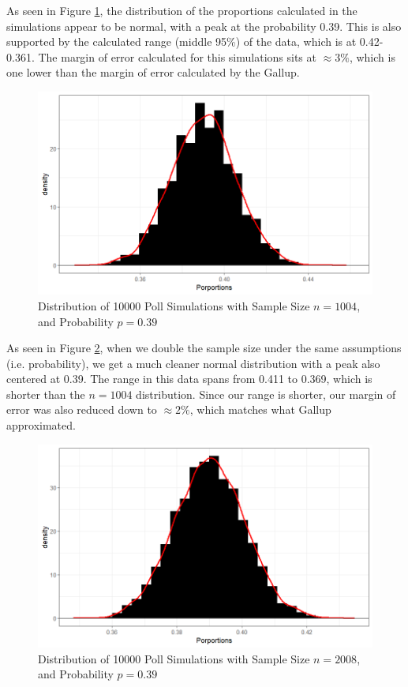 \documentclass{article}\usepackage[]{graphicx}\usepackage[]{xcolor}
\begin{document}
\begin{multicols}{2}
As seen in Figure \hyperref[fig1]{1}, the distribution of the proportions calculated in the simulations appear to be normal, with a peak at the probability 0.39. This is also supported by the calculated range (middle 95\%) of the data, which is at 0.42-0.361. The margin of error calculated for this simulations sits at $\approx 3\%$, which is one lower than the margin of error calculated by the Gallup.

\begin{figure}[H]
  \centering
  \includegraphics[width=\columnwidth]{sample1004.png}
  \caption{Distribution of 10000 Poll Simulations with Sample Size $n = 1004$, and Probability $p = 0.39$}
  \label{fig1}
\end{figure}

As seen in Figure \hyperref[fig2]{2}, when we double the sample size under the same assumptions (i.e. probability), we get a much cleaner normal distribution with a peak also centered at 0.39. The range in this data spans from 0.411 to 0.369, which is shorter than the $n = 1004$ distribution. Since our range is shorter, our margin of error was also reduced down to $\approx 2\%$, which matches what Gallup approximated.

\begin{figure}[H]
  \centering
  \includegraphics[width=\columnwidth]{sample2008.png}
  \caption{Distribution of 10000 Poll Simulations with Sample Size $n = 2008$, and Probability $p = 0.39$}
  \label{fig2}
\end{figure}


\end{multicols}
\end{document}
